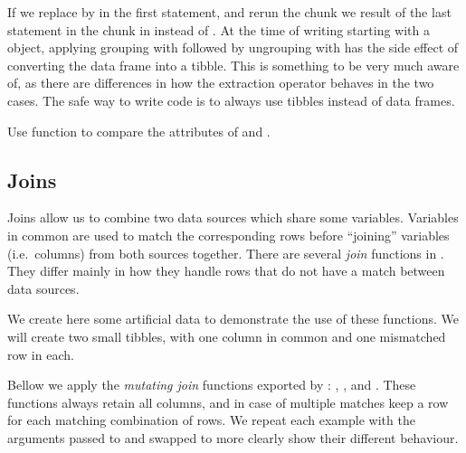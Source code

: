 \documentclass[krantz2]{krantz}\usepackage{knitr}%
\begin{document}
\begin{warningbox}
If we replace  by  in the first statement, and rerun the chunk we result of the last statement in the chunk in  instead of . At the time of writing starting with a  object, applying grouping with  followed by ungrouping with  has the side effect of converting the data frame into a tibble. This is something to be very much aware of, as there are differences in how the extraction operator \Roperator{[ , ]} behaves in the two cases. The safe way to write  code is to always use tibbles instead of data frames.

Use function  to compare the attributes of   and .
\end{warningbox}

\subsection{Joins}

Joins allow us to combine two data sources which share some variables. Variables in common are used to match the corresponding rows before ``joining'' variables (i.e.\ columns) from both sources together. There are several \emph{join} functions in . They differ mainly in how they handle rows that do not have a match between data sources.

We create here some artificial data to demonstrate the use of these functions. We will create two small tibbles, with one column in common and one mismatched row in each.

\begin{knitrout}\footnotesize
{}\color{fgcolor}\begin{kframe}
\begin{alltt}
 \hlkwb{<-} \hlstd{(} \hlstd{=} \hlstd{(}\hlopt{:}\hlstd{,} \hlstd{),}  \hlstd{=} \hlstd{)}
 \hlkwb{<-} \hlstd{(} \hlstd{=} \hlstd{(}\hlopt{:}\hlstd{,} \hlstd{),}  \hlstd{=} \hlstd{)}
\end{alltt}
\end{kframe}
\end{knitrout}

Bellow we apply the \emph{mutating join} functions exported by : , ,  and . These functions always retain all columns, and in case of multiple matches keep a row for each matching combination of rows. We repeat each example with the arguments passed to  and  swapped to more clearly show their different behaviour.
\end{document}
